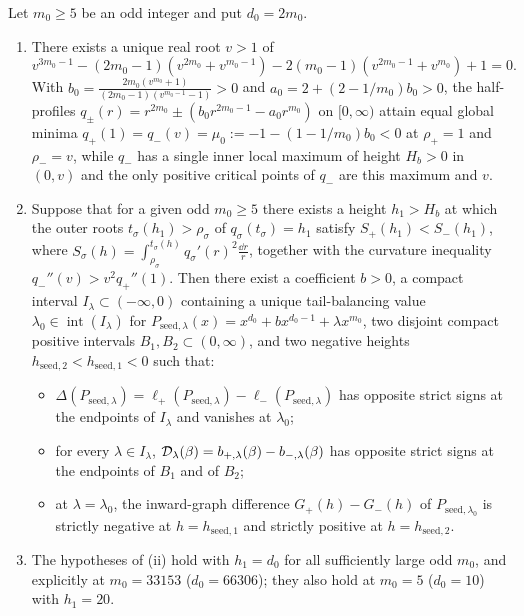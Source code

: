 \begin{lemma}\label{lem:compact-seed}
Let $m_0\ge 5$ be an odd integer and put $d_0=2m_0$.
\begin{enumerate}
  \item[\textup{(i)}] There exists a unique real root $v>1$ of
  \begin{equation}\label{eq:seed-v-poly}
    v^{3m_0-1} - (2m_0-1)(v^{2m_0} + v^{m_0-1}) - 2(m_0-1)(v^{2m_0-1} + v^{m_0}) + 1 = 0.
  \end{equation}
  With $b_0 = \frac{2m_0(v^{m_0}+1)}{(2m_0-1)(v^{m_0-1}-1)}>0$ and $a_0 = 2 + (2-1/m_0)b_0>0$, the
  half-profiles $q_\pm(r)=r^{2m_0}\pm(b_0 r^{2m_0-1}-a_0 r^{m_0})$ on $[0,\infty)$ attain equal global
  minima $q_+(1)=q_-(v)=\mu_0 := -1-(1-1/m_0)b_0<0$ at $\rho_+=1$ and $\rho_-=v$, while $q_-$ has a
  single inner local maximum of height $H_b>0$ in $(0,v)$ and the only positive critical points of
  $q_-$ are this maximum and $v$.
  \item[\textup{(ii)}] Suppose that for a given odd $m_0\ge 5$ there exists a height $h_1>H_b$ at
  which the outer roots $t_\sigma(h_1)>\rho_\sigma$ of $q_\sigma(t_\sigma)=h_1$ satisfy
  $S_+(h_1)<S_-(h_1)$, where $S_\sigma(h)=\int_{\rho_\sigma}^{t_\sigma(h)} q_\sigma'(r)^2\frac{\dd
  r}{r}$, together with the curvature inequality $q_-''(v) > v^2 q_+''(1)$. Then there exist a
  coefficient $b>0$, a compact interval $I_\lambda\subset(-\infty,0)$ containing a unique
  tail-balancing value $\lambda_0\in\operatorname{int}(I_\lambda)$ for
  $P_{\mathrm{seed},\lambda}(x)=x^{d_0}+bx^{d_0-1}+\lambda x^{m_0}$, two disjoint compact positive
  intervals $B_1,B_2\subset(0,\infty)$, and two negative heights
  $h_{\mathrm{seed},2}<h_{\mathrm{seed},1}<0$ such that:
  \begin{itemize}
    \item
    $\Delta(P_{\mathrm{seed},\lambda})=\ell_+(P_{\mathrm{seed},\lambda})-\ell_-(P_{\mathrm{seed},\lambda})$
    has opposite strict signs at the endpoints of $I_\lambda$ and vanishes at $\lambda_0$;
    \item for every $\lambda\in I_\lambda$,
    $\mathcal{D}_\lambda(\beta)=b_{+,\lambda}(\beta)-b_{-,\lambda}(\beta)$ has opposite strict signs at the
    endpoints of $B_1$ and of $B_2$;
    \item at $\lambda=\lambda_0$, the inward-graph difference $G_+(h)-G_-(h)$ of
    $P_{\mathrm{seed},\lambda_0}$ is strictly negative at $h=h_{\mathrm{seed},1}$ and strictly
    positive at $h=h_{\mathrm{seed},2}$.
  \end{itemize}
  \item[\textup{(iii)}] The hypotheses of \textup{(ii)} hold with $h_1=d_0$ for all sufficiently large
  odd $m_0$, and explicitly at $m_0=33153$ ($d_0=66306$); they also hold at $m_0=5$ ($d_0=10$) with
  $h_1=20$.
\end{enumerate}
\end{lemma}

